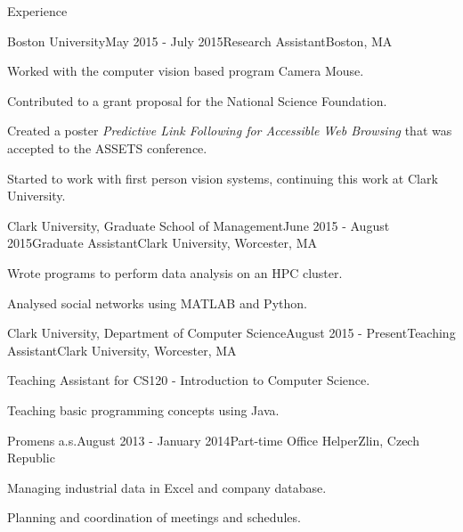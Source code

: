 \documentclass{resume} %
\begin{document}
\begin{rSection}{Experience}

\begin{rSubsection}{Boston University}{May 2015 - July 2015}{Research Assistant}{Boston, MA}
\item Worked with the computer vision based program Camera Mouse.
\item Contributed to a grant proposal for the National Science Foundation.
\item Created a poster \emph{Predictive Link Following for Accessible Web Browsing} that was accepted to the ASSETS conference.
\item Started to work with first person vision systems, continuing this work at Clark University.
\end{rSubsection}


\begin{rSubsection}{Clark University, Graduate School of Management}{June 2015 - August 2015}{Graduate Assistant}{Clark University, Worcester, MA}
\item Wrote programs to perform data analysis on an HPC cluster.
\item Analysed social networks using MATLAB and Python.
\end{rSubsection}


\begin{rSubsection}{Clark University, Department of Computer Science}{August 2015 - Present}{Teaching Assistant}{Clark University, Worcester, MA}
\item Teaching Assistant for CS120 - Introduction to Computer Science.
\item Teaching basic programming concepts using Java.
\end{rSubsection}


\begin{rSubsection}{Promens a.s.}{August 2013 - January 2014}{Part-time Office Helper}{Zlin, Czech Republic}
\item Managing industrial data in Excel and company database.
\item Planning and coordination of meetings and schedules.
\end{rSubsection}

\end{rSection}
\end{document}
